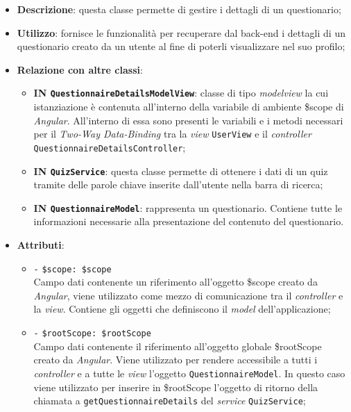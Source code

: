 \begin{itemize}
	\item \textbf{Descrizione}: questa classe permette di gestire i dettagli di un questionario; 
	\item \textbf{Utilizzo}: fornisce le funzionalità per recuperare dal back-end i dettagli di un questionario creato da un utente al fine di poterli visualizzare nel suo profilo;
	\item \textbf{Relazione con altre classi}:
	\begin{itemize}
		\item \textbf{IN \texttt{QuestionnaireDetailsModelView}}: classe di tipo \textit{modelview} la cui istanziazione è contenuta all'interno della variabile di ambiente \$scope di \textit{Angular}. All'interno di essa sono presenti le variabili e i metodi necessari per il \textit{Two-Way Data-Binding} tra la \textit{view} \texttt{UserView} e il \textit{controller} \texttt{QuestionnaireDetailsController};
		\item \textbf{IN \texttt{QuizService}}: questa classe permette di ottenere i dati di un quiz tramite delle parole chiave inserite dall'utente nella barra di ricerca;
		\item \textbf{IN \texttt{QuestionnaireModel}}: rappresenta un questionario. Contiene tutte le informazioni necessarie alla presentazione del contenuto del questionario.
	\end{itemize}
	\item \textbf{Attributi}:
	\begin{itemize}
		\item \texttt{-} \texttt{\$scope: \$scope} \\
		Campo dati contenente un riferimento all'oggetto \$scope creato da \textit{Angular}, viene utilizzato come mezzo di comunicazione tra il \textit{controller} e la \textit{view}. Contiene gli oggetti che definiscono il \textit{model} dell'applicazione;
		\item \texttt{-} \texttt{\$rootScope: \$rootScope} \\
		Campo dati contenente il riferimento all'oggetto globale \$rootScope creato da \textit{Angular}. Viene utilizzato per rendere accessibile a tutti i \textit{controller} e a tutte le \textit{view} l'oggetto \texttt{QuestionnaireModel}. In questo caso viene utilizzato per inserire in \$rootScope l'oggetto di ritorno della chiamata a \texttt{getQuestionnaireDetails} del \textit{service} \texttt{QuizService};

\end{itemize}
\end{itemize}
